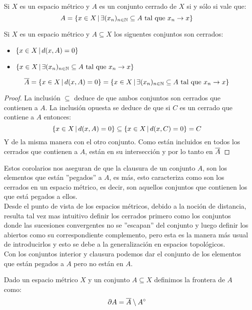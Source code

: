 \documentclass[12pt,a4paper]{book}
\begin{document}
\begin{cor}
Si $X$ es un espacio métrico y $A$ es un conjunto cerrado de $X$ si y sólo si vale que:
$$A = \{ x \in X \,\vert\, \exists (x_n)_{{n} \in \mathbb{N}} \subseteq A \mbox{ tal que } x_n \rightarrow x\}$$
\end{cor}
\begin{cor} Si $X$ es un espacio métrico y $A \subseteq X$ los siguentes conjuntos son cerrados:
\begin{itemize}
\item $\{ x \in X \,\vert\, d(x,A)=0\}$
\item $\{ x \in X \,\vert\, \exists (x_n)_{{n} \in \mathbb{N}} \subseteq A \mbox{ tal que } x_n \rightarrow x\}$
\end{itemize}
\end{cor}
\begin{cor}
$$ \overline{A} = \{ x \in X \,\vert\, d(x,A)=0\} =\{ x \in X \,\vert\, \exists (x_n)_{{n} \in \mathbb{N}} \subseteq A \mbox{ tal que } x_n \rightarrow x\} $$
\begin{proof}
La inclusión $\subseteq$ deduce de que ambos conjuntos son cerrados que contienen a $A$. La inclusión opuesta se deduce de que si $C$ es un cerrado que contiene a $A$ entonces:
$$ \{ x \in X \,\vert\, d(x,A)=0\} \subseteq \{ x \in X \,\vert\, d(x,C)=0\} = C$$
Y de la misma manera con el otro conjunto. Como están incluidos en todos los cerrados que contienen a $A$, están en su intersección y por lo tanto en $\overline{A}$
\end{proof}
\end{cor} 
Estos corolarios nos aseguran de que la clausura de un conjunto $A$, son los elementos que están ''pegados'' a $A$, es más, esto caracteriza como son los cerrados en un espacio métrico, es decir, son aquellos conjuntos que contienen los que está pegados a ellos. \\
Desde el punto de vista de los espacios métricos, debido a la noción de distancia, resulta tal vez mas intuitivo definir los cerrados primero como los conjuntos donde las sucesiones convergentes no se ''escapan'' del conjunto y luego definir los abiertos como su correspondiente complemento, pero esta es la manera más usual de introducirlos y esto se debe a la generalización en espacios topológicos.\\[0.5cm]
Con los conjuntos interior y clausura podemos dar el conjunto de los elementos que están pegados a $A$ pero no están en $A$.
\begin{defi} Dado un espacio métrico $X$ y un conjunto $A \subseteq X$ definimos la frontera de $A$ como:
$$ \partial A = \overline{A} \setminus A^\circ$$
\end{defi}
\end{document}

